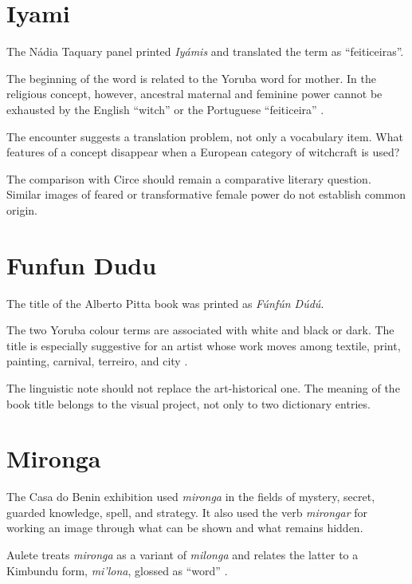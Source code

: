 \section{Iyami}
\label{section-languages-iyami}

The N\'adia Taquary panel printed
\emph{Iy\'amis} and translated the term as
``feiticeiras''.

The beginning of the word is related to
the Yoruba word for mother.  In the
religious concept, however, ancestral
maternal and feminine power cannot be
exhausted by the English ``witch'' or the
Portuguese ``feiticeira''
\cite{santos2008iyami}.

The encounter suggests a translation
problem, not only a vocabulary item.  What
features of a concept disappear when a
European category of witchcraft is used?

The comparison with Circe should remain a
comparative literary question.  Similar
images of feared or transformative female
power do not establish common origin.

\section{Funfun Dudu}
\label{section-languages-funfun-dudu}

The title of the Alberto Pitta book was
printed as \emph{F\'unf\'un D\'ud\'u}.

The two Yoruba colour terms are associated
with white and black or dark.  The title is
especially suggestive for an artist whose
work moves among textile, print, painting,
carnival, terreiro, and city
\cite{barata2025pitta}.

The linguistic note should not replace the
art-historical one.  The meaning of the
book title belongs to the visual project,
not only to two dictionary entries.

\section{Mironga}
\label{section-languages-mironga}

The Casa do Benin exhibition used
\emph{mironga} in the fields of mystery,
secret, guarded knowledge, spell, and
strategy.  It also used the verb
\emph{mirongar} for working an image through
what can be shown and what remains hidden.

Aulete treats \emph{mironga} as a variant
of \emph{milonga} and relates the latter to
a Kimbundu form, \emph{mi'lona}, glossed as
``word'' \cite{aulete-milonga}.

